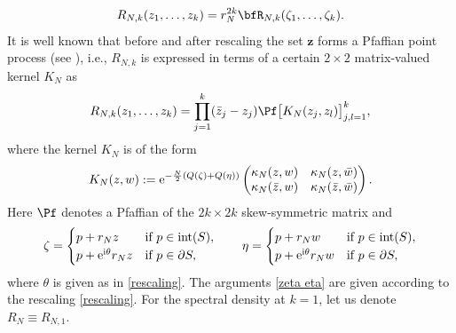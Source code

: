 \begin{gather*}
R_{N,k}(z_1,\dots, z_k)=r_N^{2k} \bfR_{N,k}(\zeta_1,\dots,\zeta_k).
\end{gather*}
It is well known that before and after rescaling the
set $\boldsymbol{z}$ forms a Pfaffian point process (see \cite{MR1928853,Mehta}), i.e., $R_{N,k}$ is expressed in terms of a certain $2\times 2$ matrix-valued kernel $K_N$ as
\begin{gather} \label{RNk Pf}
	R_{N,k}(z_1,\dots, z_k)=\prod_{j=1}^{k}
(\bar{z}_j-z_j) \Pf \big[ K_{N}(z_j,z_l) \big]_{ j,l=1 }^k ,
\end{gather}
where the kernel $K_N$ is of the form
\begin{gather*}
	K_N(z,w):={\rm e}^{ -\frac{N}{2} (Q( \zeta )+Q( \eta )) } \begin{pmatrix}
		\kappa_N(z,w) & \kappa_N(z,\bar{w}) \\
		\kappa_N(\bar{z},w) & \kappa_N(\bar{z},\bar{w})
	\end{pmatrix}.
\end{gather*}
Here $\Pf$ denotes a Pfaffian of the $2k \times 2k$ skew-symmetric matrix and
\begin{gather} \label{zeta eta}
\zeta=\begin{cases}
	p+r_N z &\text{if }p \in \textup{int}(S),
	\\
	p+{\rm e}^{{\rm i}\theta} r_N z &\text{if }p \in \partial S,
\end{cases} \qquad
 \eta=\begin{cases}
	 p+r_N w &\text{if }p \in \textup{int}(S),
	\\
	 p+{\rm e}^{{\rm i}\theta} r_N w &\text{if }p \in \partial S,
\end{cases}
\end{gather}
where $\theta$ is given as in \eqref{rescaling}.
The arguments \eqref{zeta eta} are given according to the rescaling \eqref{rescaling}.
For the spectral density at $k=1$, let us denote $R_N \equiv R_{N,1}$.

